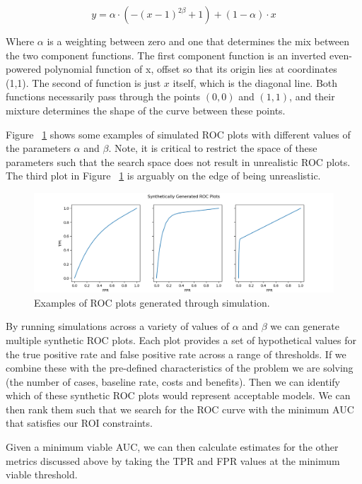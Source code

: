 \documentclass[12pt,a4paper]{article}
\numberwithin{equation}{section}
\begin{document}
\begin{equation}
\label{auc:sim}
y = \alpha \cdot (-(x-1)^{2\beta}+1) + (1-\alpha) \cdot x
\end{equation}

Where $\alpha$ is a weighting between zero and one that determines the 
mix between the two component functions. The first component function is an 
inverted even-powered polynomial function of x, offset so that its origin 
lies at coordinates {(1,1)}.
The second of function is just $x$ itself, which is the diagonal line.
Both functions necessarily pass through 
the points $(0,0)$ and $(1,1)$, and their mixture determines the shape of the
curve between these points.
 
Figure ~\ref{fig:ROC} shows some examples of simulated ROC plots with different values of 
the parameters $\alpha$ and $\beta$. Note, it is critical to restrict the space of these parameters such
that the search space does not result in unrealistic ROC plots. The third plot in Figure  ~\ref{fig:ROC}
is arguably on the edge of being unreaslistic. 

\begin{figure}[h!]
\includegraphics[scale=0.5]{images/roc_plots.png}
\caption{Examples of ROC plots generated through simulation.}
\label{fig:ROC}
\end{figure}


By running simulations across a variety of values of $\alpha$ and $\beta$
we can generate multiple synthetic ROC plots. Each plot provides a set of hypothetical
values for the true positive rate and false positive rate across a range of thresholds.
If we combine these with the pre-defined characteristics of the problem we are solving
(the number of cases, baseline rate, costs and benefits). Then we can identify which
of these synthetic ROC plots would represent acceptable models. We can then rank
them such that we search for the ROC curve with the minimum AUC that satisfies our
ROI constraints.

Given a minimum viable AUC, we can then calculate estimates for the other metrics discussed
above by taking the TPR and FPR values at the minimum viable threshold.
\end{document}
